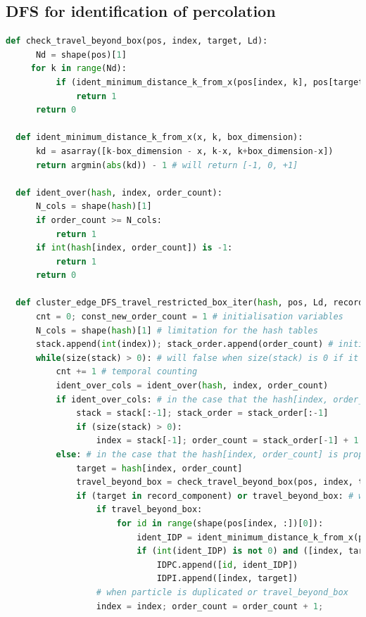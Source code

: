 \documentclass[10pt, a4paper]{article}
\begin{document}
\begin{appendices}
\subsection{DFS for identification of percolation}
\label{sec:orgheadline18}
\begin{lstlisting}[language=python,frame=single, numbers=none]
  def check_travel_beyond_box(pos, index, target, Ld):
      Nd = shape(pos)[1]
     for k in range(Nd):
          if (ident_minimum_distance_k_from_x(pos[index, k], pos[target, k], Ld) != 0):
              return 1
      return 0
  
  def ident_minimum_distance_k_from_x(x, k, box_dimension):
      kd = asarray([k-box_dimension - x, k-x, k+box_dimension-x])
      return argmin(abs(kd)) - 1 # will return [-1, 0, +1]
  
  def ident_over(hash, index, order_count):
      N_cols = shape(hash)[1]
      if order_count >= N_cols:
          return 1
      if int(hash[index, order_count]) is -1:
          return 1
      return 0
  
  def cluster_edge_DFS_travel_restricted_box_iter(hash, pos, Ld, record_component, index=0, order_count=1, cnt=0, IDPC=[], IDPI=[], stack=[], stack_order=[]):
      cnt = 0; const_new_order_count = 1 # initialisation variables
      N_cols = shape(hash)[1] # limitation for the hash tables
      stack.append(int(index)); stack_order.append(order_count) # initial stacking
      while(size(stack) > 0): # will false when size(stack) is 0 if it is not initial step
          cnt += 1 # temporal counting 
          ident_over_cols = ident_over(hash, index, order_count)
          if ident_over_cols: # in the case that the hash[index, order_count] reaching end (-1 or order_count is over)
              stack = stack[:-1]; stack_order = stack_order[:-1]
              if (size(stack) > 0):
                  index = stack[-1]; order_count = stack_order[-1] + 1
          else: # in the case that the hash[index, order_count] is properly defined
              target = hash[index, order_count]
              travel_beyond_box = check_travel_beyond_box(pos, index, target, Ld)
              if (target in record_component) or travel_beyond_box: # when target is in stack stack or travel beyond box boundary
                  if travel_beyond_box: 
                      for id in range(shape(pos[index, :])[0]):
                          ident_IDP = ident_minimum_distance_k_from_x(pos[index, id], pos[target, id], Ld)
                          if (int(ident_IDP) is not 0) and ([index, target] not in IDPI):
                              IDPC.append([id, ident_IDP])
                              IDPI.append([index, target])
                  # when particle is duplicated or travel_beyond_box
                  index = index; order_count = order_count + 1;
  

\end{lstlisting}
\end{appendices}
\end{document}
